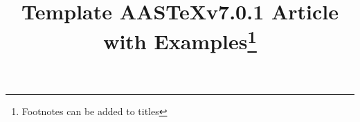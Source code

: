 \documentclass[apjl, linenumbers]{aastex701}
\newcommand\aastex{AAS\TeX}
\begin{document}
\title{Template \aastex v7.0.1 Article with Examples\footnote{Footnotes can be added to titles}}

\end{document}
